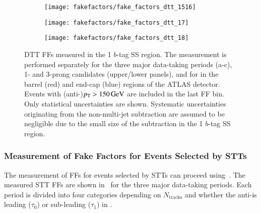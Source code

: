 \begin{figure}[htbp]
  \centering

  \begin{subfigure}{0.495\textwidth}
    \texttt{[image: fakefactors/fake\_factors\_dtt\_1516]}
  \end{subfigure}
  \begin{subfigure}{0.495\textwidth}
    \texttt{[image: fakefactors/fake\_factors\_dtt\_17]}
  \end{subfigure}

  \begin{subfigure}{0.495\textwidth}
    \texttt{[image: fakefactors/fake\_factors\_dtt\_18]}
  \end{subfigure}

  \caption{DTT FFs measured in the 1 $b$-tag SS region. The measurement is
    performed separately for the three major data-taking periods (a-c), 1- and
    3-prong \tauhadvis candidates (upper/lower panels), and for \tauhadvis in
    the barrel (red) and end-cap (blue) regions of the ATLAS detector. Events
    with (anti-)\tauhadvis $p_{\text{T}} > \SI{150}{\ensuremath{\text{GeV}}}$ are included in the last FF
    bin. Only statistical uncertainties are shown. Systematic uncertainties
    originating from the non-multi-jet subtraction are assumed to be negligible
    due to the small size of the subtraction in the 1 $b$-tag SS region.}%
  \label{fig:mjfakes_fake_factors}
\end{figure}


\subsubsection{Measurement of Fake Factors for Events Selected by STTs}

The measurement of FFs for events selected by STTs can proceed
using~. The measured STT FFs are shown
in~ for the three major data-taking periods. Each
period is divided into four categories depending on $N_{\text{tracks}}$ and
whether the anti-\tauhadvis is leading ($\tau_0$) or sub-leading ($\tau_1$) in
\pT.



